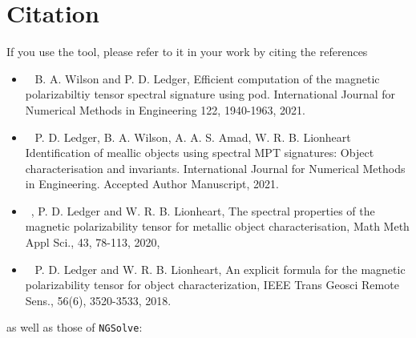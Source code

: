 \section{Citation}

If you use the tool, please refer to it in your work by citing the references

\begin{itemize}
\item	~\cite{wilsonledger2019} B. A. Wilson and P. D. Ledger, Efficient computation of the magnetic polarizabiltiy tensor spectral signature using pod. International Journal for Numerical Methods in Engineering 122, 1940-1963, 2021. %

\item~\cite{ledger2020identification} P. D. Ledger, B. A. Wilson, A. A. S. Amad, W. R. B. Lionheart Identification of meallic objects using spectral MPT signatures: Object characterisation and invariants. International Journal for Numerical Methods in Engineering. Accepted Author Manuscript, 2021. %

\item ~\cite{LedgerLionheart2019}, P. D. Ledger and W. R. B. Lionheart, The spectral properties of the magnetic polarizability tensor for metallic object characterisation, Math Meth Appl Sci., 43, 78-113, 2020,

\item ~\cite{LedgerLionheart2018} P. D. Ledger and W. R. B. Lionheart,  An explicit formula for the magnetic polarizability tensor for object characterization, {IEEE} Trans Geosci Remote Sens., 56(6), 3520-3533, 2018.



\end{itemize}

as well as those of \texttt{NGSolve}:

